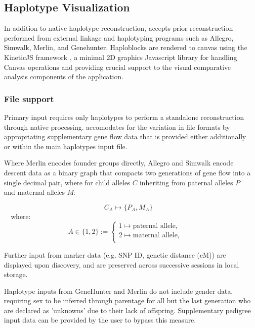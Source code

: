 
\subsection{Haplotype Visualization}

In addition to native haplotype reconstruction, \haplo accepts prior reconstruction performed from external linkage and haplotyping programs such as Allegro, Simwalk, Merlin, and Genehunter. Haploblocks are rendered to canvas using the KineticJS framework \citep{kineticjs}, a minimal 2D graphics Javascript library for handling Canvas operations and providing crucial support to the visual comparative analysis components of the application.

\subsubsection{File support}

Primary input requires only haplotypes to perform a standalone reconstruction through native processing. \haplo accomodates for the variation in file formats by appropriating supplementary gene flow data that is provided either additionally or within the main haplotypes input file.

Where Merlin \citep{merlin} encodes founder groups directly, Allegro and Simwalk \citep{allegro,simwalk} encode descent data as a binary graph that compacts two generations of gene flow into a single decimal pair, where for child alleles $C$ inheriting from paternal alleles $P$ and maternal alleles $M$:

\begin{equation}
C_A \mapsto \{P_A,M_A\}
\end{equation}\
\
where:\
\begin{equation}
A \in \{1,2\} := 
    \begin{cases}
      1 \mapsto \text{paternal allele}, &\\
      2 \mapsto \text{maternal allele}, &\\
    \end{cases}
\end{equation}


Further input from marker data (e.g. SNP ID, genetic distance (cM)) are displayed upon discovery, and are preserved across successive sessions in local storage. 

Haplotype inputs from GeneHunter and Merlin do not include gender data, requiring sex to be inferred through parentage for all but the last generation who are declared as 'unknowns' due to their lack of offspring. Supplementary pedigree input data can be provided by the user to bypass this measure.


